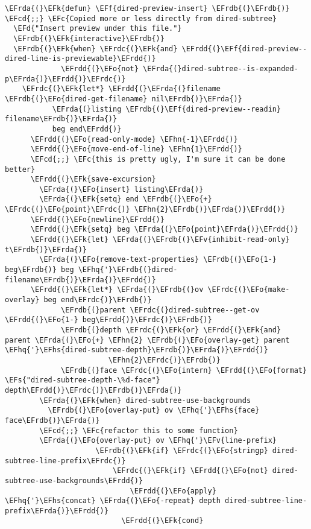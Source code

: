 \documentclass[a4wide,10pt]{article}
\newcommand{\EFc}[1]{\textcolor{EFc}{#1}} %
\newcommand{\EFcd}[1]{\textcolor{EFcd}{#1}} %
\newcommand{\EFs}[1]{\textcolor{EFs}{#1}} %
\newcommand{\EFd}[1]{\textcolor{EFd}{#1}} %
\newcommand{\EFk}[1]{\textcolor{EFk}{#1}} %
\newcommand{\EFf}[1]{\textcolor{EFf}{#1}} %
\newcommand{\EFv}[1]{\textcolor{EFv}{#1}} %
\newcommand{\EFo}[1]{\textcolor{EFo}{#1}} %
\newcommand{\EFhn}[1]{\textcolor{EFhn}{\textbf{#1}}} %
\newcommand{\EFhq}[1]{\textcolor{EFhq}{#1}} %
\newcommand{\EFhs}[1]{\textcolor{EFhs}{#1}} %
\newcommand{\EFrda}[1]{\textcolor{EFrda}{#1}} %
\newcommand{\EFrdb}[1]{\textcolor{EFrdb}{#1}} %
\newcommand{\EFrdc}[1]{\textcolor{EFrdc}{#1}} %
\newcommand{\EFrdd}[1]{\textcolor{EFrdd}{#1}} %
\begin{document}
\begin{Code}
\begin{Verbatim}
\EFrda{(}\EFk{defun} \EFf{dired-preview-insert} \EFrdb{(}\EFrdb{)}          \EFcd{;;} \EFc{Copied more or less directly from dired-subtree}
  \EFd{"Insert preview under this file."}
  \EFrdb{(}\EFk{interactive}\EFrdb{)}
  \EFrdb{(}\EFk{when} \EFrdc{(}\EFk{and} \EFrdd{(}\EFf{dired-preview--dired-line-is-previewable}\EFrdd{)}
             \EFrdd{(}\EFo{not} \EFrda{(}dired-subtree--is-expanded-p\EFrda{)}\EFrdd{)}\EFrdc{)}
    \EFrdc{(}\EFk{let*} \EFrdd{(}\EFrda{(}filename \EFrdb{(}\EFo{dired-get-filename} nil\EFrdb{)}\EFrda{)}
           \EFrda{(}listing \EFrdb{(}\EFf{dired-preview--readin} filename\EFrdb{)}\EFrda{)}
           beg end\EFrdd{)}
      \EFrdd{(}\EFo{read-only-mode} \EFhn{-1}\EFrdd{)}
      \EFrdd{(}\EFo{move-end-of-line} \EFhn{1}\EFrdd{)}
      \EFcd{;;} \EFc{this is pretty ugly, I'm sure it can be done better}
      \EFrdd{(}\EFk{save-excursion}
        \EFrda{(}\EFo{insert} listing\EFrda{)}
        \EFrda{(}\EFk{setq} end \EFrdb{(}\EFo{+} \EFrdc{(}\EFo{point}\EFrdc{)} \EFhn{2}\EFrdb{)}\EFrda{)}\EFrdd{)}
      \EFrdd{(}\EFo{newline}\EFrdd{)}
      \EFrdd{(}\EFk{setq} beg \EFrda{(}\EFo{point}\EFrda{)}\EFrdd{)}
      \EFrdd{(}\EFk{let} \EFrda{(}\EFrdb{(}\EFv{inhibit-read-only} t\EFrdb{)}\EFrda{)}
        \EFrda{(}\EFo{remove-text-properties} \EFrdb{(}\EFo{1-} beg\EFrdb{)} beg \EFhq{'}\EFrdb{(}dired-filename\EFrdb{)}\EFrda{)}\EFrdd{)}
      \EFrdd{(}\EFk{let*} \EFrda{(}\EFrdb{(}ov \EFrdc{(}\EFo{make-overlay} beg end\EFrdc{)}\EFrdb{)}
             \EFrdb{(}parent \EFrdc{(}dired-subtree--get-ov \EFrdd{(}\EFo{1-} beg\EFrdd{)}\EFrdc{)}\EFrdb{)}
             \EFrdb{(}depth \EFrdc{(}\EFk{or} \EFrdd{(}\EFk{and} parent \EFrda{(}\EFo{+} \EFhn{2} \EFrdb{(}\EFo{overlay-get} parent \EFhq{'}\EFhs{dired-subtree-depth}\EFrdb{)}\EFrda{)}\EFrdd{)}
                        \EFhn{2}\EFrdc{)}\EFrdb{)}
             \EFrdb{(}face \EFrdc{(}\EFo{intern} \EFrdd{(}\EFo{format} \EFs{"dired-subtree-depth-\%d-face"} depth\EFrdd{)}\EFrdc{)}\EFrdb{)}\EFrda{)}
        \EFrda{(}\EFk{when} dired-subtree-use-backgrounds
          \EFrdb{(}\EFo{overlay-put} ov \EFhq{'}\EFhs{face} face\EFrdb{)}\EFrda{)}
        \EFcd{;;} \EFc{refactor this to some function}
        \EFrda{(}\EFo{overlay-put} ov \EFhq{'}\EFv{line-prefix}
                     \EFrdb{(}\EFk{if} \EFrdc{(}\EFo{stringp} dired-subtree-line-prefix\EFrdc{)}
                         \EFrdc{(}\EFk{if} \EFrdd{(}\EFo{not} dired-subtree-use-backgrounds\EFrdd{)}
                             \EFrdd{(}\EFo{apply} \EFhq{'}\EFhs{concat} \EFrda{(}\EFo{-repeat} depth dired-subtree-line-prefix\EFrda{)}\EFrdd{)}
                           \EFrdd{(}\EFk{cond}

\end{Verbatim}
\end{Code}
\end{document}
